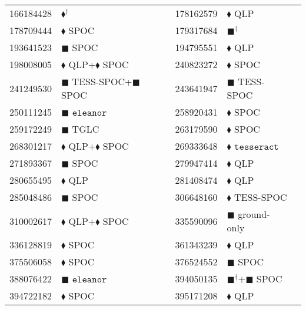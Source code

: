 \begin{longtable}{llrllr}
166184428 & $\blacklozenge^\dagger$ & \cite{TIC_166184428} & 178162579 & $\blacklozenge$ QLP & \cite{TIC_156648452} \\
178709444 & $\blacklozenge$ SPOC & \cite{TIC_178709444} & 179317684 & $\blacksquare^\dagger$ & \cite{TIC_179317684} \\
193641523 & $\blacksquare$ SPOC & \cite{TIC_193641523} & 194795551 & $\blacklozenge$ QLP & \cite{TIC_70524163} \\
198008005 & $\blacklozenge$ QLP+$\blacklozenge$ SPOC & \cite{TIC_198008005} & 240823272 & $\blacklozenge$ SPOC & \cite{TIC_70524163} \\
241249530 & $\blacksquare$ TESS-SPOC+$\blacksquare$ SPOC & \cite{TIC_241249530} & 243641947 & $\blacksquare$ TESS-SPOC & \cite{TIC_243641947} \\
250111245 & $\blacksquare$ $\texttt{eleanor}$ & \cite{TIC_20182780} & 258920431 & $\blacklozenge$ SPOC & \cite{TIC_70524163} \\
259172249 & $\blacksquare$ TGLC & \cite{TIC_259172249} & 263179590 & $\blacklozenge$ SPOC & \cite{TIC_263179590} \\
268301217 & $\blacklozenge$ QLP+$\blacklozenge$ SPOC & \cite{TIC_156648452} & 269333648 & $\blacklozenge$ $\texttt{tesseract}$ & \cite{TIC_4672985} \\
271893367 & $\blacksquare$ SPOC & \cite{TIC_271893367} & 279947414 & $\blacklozenge$ QLP & \cite{TIC_156648452} \\
280655495 & $\blacklozenge$ QLP & \cite{TIC_156648452} & 281408474 & $\blacklozenge$ QLP & \cite{TIC_409794137} \\
285048486 & $\blacksquare$ SPOC & \cite{TIC_285048486} & 306648160 & $\blacklozenge$ TESS-SPOC & \cite{TIC_446549906} \\
310002617 & $\blacklozenge$ QLP+$\blacklozenge$ SPOC & \cite{TIC_156648452} & 335590096 & $\blacksquare$ ground-only & \cite{TIC_335590096} \\
336128819 & $\blacklozenge$ SPOC & \cite{TIC_336128819} & 361343239 & $\blacklozenge$ QLP & \cite{TIC_156648452} \\
375506058 & $\blacklozenge$ SPOC & \cite{TIC_375506058} & 376524552 & $\blacksquare$ SPOC & \cite{TIC_428787891} \\
388076422 & $\blacksquare$ $\texttt{eleanor}$ & \cite{TIC_259172249} & 394050135 & $\blacksquare^\dagger$+$\blacksquare$ SPOC & \cite{TIC_428787891} \\
394722182 & $\blacklozenge$ SPOC & \cite{TIC_70524163} & 395171208 & $\blacklozenge$ QLP & \cite{TIC_409794137} \\

\end{longtable}
